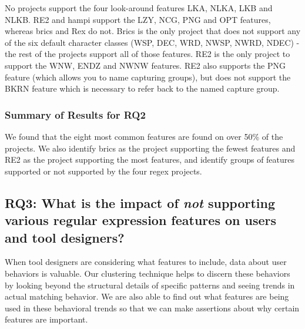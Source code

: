 No projects support the four look-around features LKA, NLKA, LKB and NLKB.  RE2 and hampi support the LZY, NCG, PNG and OPT features, whereas brics and Rex do not.  Brics is the only project that does not support any of the six default character classes (WSP, DEC, WRD, NWSP, NWRD, NDEC) - the rest of the projects support all of those features.  RE2 is the only project to support the WNW, ENDZ and NWNW features.  RE2 also supports the PNG feature (which allows you to name capturing groups), but does not support the BKRN feature which is necessary to refer back to the named capture group.



\subsubsection{Summary of Results for RQ2}
We found that the eight most common features are found on over 50\% of the projects.
We also identify brics as the project supporting the fewest features and RE2 as the project supporting the most features, and identify groups of features supported or not supported by the four regex projects.


\subsection{{RQ3:} What is the impact of \emph{not} supporting various regular expression features on users and tool designers?}
\label{results:rq3}

When tool designers are considering what features to include, data about user behaviors is valuable.  Our clustering technique helps to discern these behaviors by looking beyond the structural details of specific patterns and seeing trends in actual matching behavior.  We are also able to find out what features are being used in these behavioral trends so that we can make assertions about why certain features are important.

